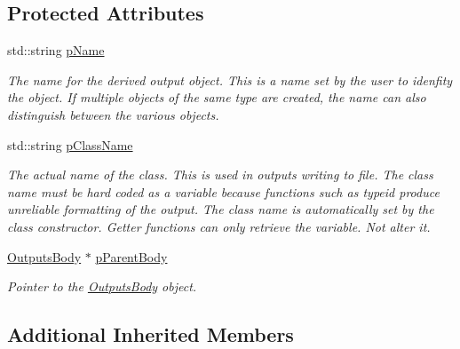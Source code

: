 \subsection*{Protected Attributes}
\begin{DoxyCompactItemize}
\item 
\hypertarget{classosea_1_1ofreq_1_1_output_derived_a4ab81d265885b1c9fb9b4596dc9cd093}{std\-::string \hyperlink{classosea_1_1ofreq_1_1_output_derived_a4ab81d265885b1c9fb9b4596dc9cd093}{p\-Name}}\label{classosea_1_1ofreq_1_1_output_derived_a4ab81d265885b1c9fb9b4596dc9cd093}

\begin{DoxyCompactList}\small\item\em The name for the derived output object. This is a name set by the user to idenfity the object. If multiple objects of the same type are created, the name can also distinguish between the various objects. \end{DoxyCompactList}\item 
\hypertarget{classosea_1_1ofreq_1_1_output_derived_a50a1b7eb160d2e9c7a89b151df1dd008}{std\-::string \hyperlink{classosea_1_1ofreq_1_1_output_derived_a50a1b7eb160d2e9c7a89b151df1dd008}{p\-Class\-Name}}\label{classosea_1_1ofreq_1_1_output_derived_a50a1b7eb160d2e9c7a89b151df1dd008}

\begin{DoxyCompactList}\small\item\em The actual name of the class. This is used in outputs writing to file. The class name must be hard coded as a variable because functions such as typeid produce unreliable formatting of the output. The class name is automatically set by the class constructor. Getter functions can only retrieve the variable. Not alter it. \end{DoxyCompactList}\item 
\hyperlink{classosea_1_1ofreq_1_1_outputs_body}{Outputs\-Body} $\ast$ \hyperlink{classosea_1_1ofreq_1_1_output_derived_a62d01bedaed33feb53c4108eaf8e4baf}{p\-Parent\-Body}
\begin{DoxyCompactList}\small\item\em Pointer to the \hyperlink{classosea_1_1ofreq_1_1_outputs_body}{Outputs\-Body} object. \end{DoxyCompactList}\end{DoxyCompactItemize}
\subsection*{Additional Inherited Members}


